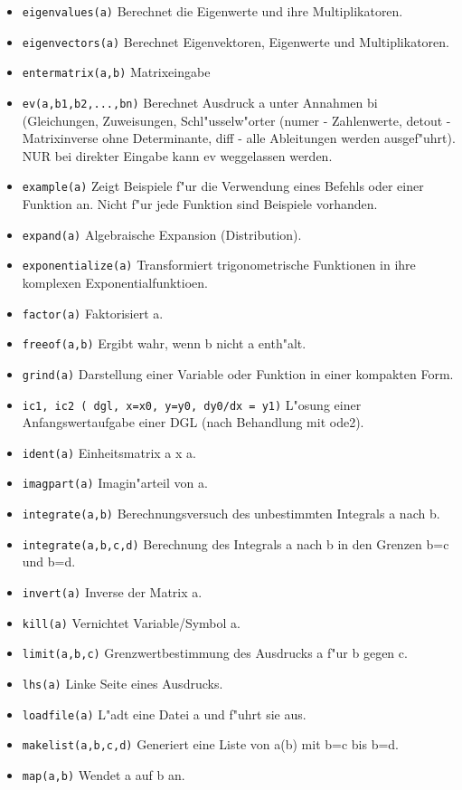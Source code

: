 \documentclass[ngerman,12pt,a4paper]{article}
\begin{document}
\begin{itemize}
\item \verb|eigenvalues(a)| Berechnet die Eigenwerte und ihre Multiplikatoren.
\item \verb|eigenvectors(a)| Berechnet Eigenvektoren, Eigenwerte und Multiplikatoren.
\item \verb|entermatrix(a,b)| Matrixeingabe
\item \verb|ev(a,b1,b2,...,bn)| Berechnet Ausdruck a unter Annahmen bi (Gleichungen, Zuweisungen, Schl"usselw"orter (numer - Zahlenwerte, detout - Matrixinverse ohne Determinante, diff - alle Ableitungen werden ausgef"uhrt). NUR bei direkter Eingabe kann ev weggelassen werden.
\item \verb|example(a)| Zeigt Beispiele f"ur die Verwendung eines Befehls oder einer Funktion an. Nicht f"ur jede Funktion sind Beispiele vorhanden.
\item \verb|expand(a)| Algebraische Expansion (Distribution).
\item \verb|exponentialize(a)| Transformiert trigonometrische Funktionen in ihre komplexen Exponentialfunktioen.
\item \verb|factor(a)| Faktorisiert a.
\item \verb|freeof(a,b)| Ergibt wahr, wenn b nicht a enth"alt.
\item \verb|grind(a)| Darstellung einer Variable oder Funktion in einer kompakten Form.
\item \verb|ic1, ic2 ( dgl, x=x0, y=y0, dy0/dx = y1)| L"osung einer Anfangswertaufgabe einer DGL (nach Behandlung mit ode2).
\item \verb|ident(a)| Einheitsmatrix a x a.
\item \verb|imagpart(a)| Imagin"arteil von a.
\item \verb|integrate(a,b)| Berechnungsversuch des unbestimmten Integrals a nach b.
\item \verb|integrate(a,b,c,d)| Berechnung des Integrals a nach b in den Grenzen b=c und b=d.
\item \verb|invert(a)| Inverse der Matrix a.
\item \verb|kill(a)| Vernichtet Variable/Symbol a.
\item \verb|limit(a,b,c)| Grenzwertbestimmung des Ausdrucks a f"ur b gegen c.
\item \verb|lhs(a)| Linke Seite eines Ausdrucks.
\item \verb|loadfile(a)| L"adt eine Datei a und f"uhrt sie aus.
\item \verb|makelist(a,b,c,d)| Generiert eine Liste von a(b) mit b=c bis b=d.
\item \verb|map(a,b)| Wendet a auf b an.

\end{itemize}
\end{document}
